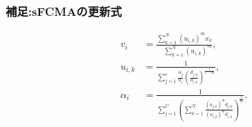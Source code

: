 \documentclass[13pt,dvipdfmx]{beamer}
\begin{document}
\begin{frame}\frametitle{補足:sFCMAの更新式}
  \begin{eqnarray*}
  &v_{i}&=\frac{\sum_{k=1}^N(u_{i,k})^mx_{k}}{\quad\sum_{k=1}^N(u_{i,k})^{m}},\\
  &u_{i,k}&=\frac{1}{\sum_{j=1}^c\frac{\alpha_{j}}{\alpha_{i}}\left(\frac{d_{j,k}}{d_{i,k}}\right)^\frac{1}{1-m}},\\
  &\alpha_{i}&=\frac{1}{\sum_{j=1}^C\left(\sum_{k=1}^N\frac{(u_{j,k})^md_{j,k}}{(u_{i,k})^md_{i,k}}\right)^{\frac{1}{m}}}.\\
  \end{eqnarray*}
\end{frame}
\end{document}
